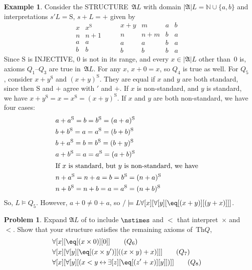 \documentclass[10pt,a4paper]{article}
\makeatletter
\newcommand*{\olup}[1]{\MakeUppercase{#1}}
\theoremstyle{plain}
\theoremstyle{definition}
\newtheorem{ex}[thm]{Example}
\newtheorem{prob}{Problem}[section]
\theoremstyle{remark}
\newcommand*{\ollabel}[1]{\label{#1}}
\newcommand{\olref}{\@ifnextchar[{\olref@i}{\olref@final}}
\def\olref@i[#1]{\@ifnextchar[{\olref@ii}{\olref@final}}
\def\olref@ii[#1]{\@ifnextchar[{\olref@iii}{\olref@final}}
\def\olref@iii[#1]{\olref@final}
\def\olref@final#1{\ref{#1}}
\providecommand{\lforall}{\mathord{\forall}}
\providecommand{\lexists}{\mathord{\exists}}
\providecommand{\Obj}{}
\providecommand{\Struct}{\ensuremath{\mathfrak{A}}}
\providecommand{\Domain}{\ensuremath{|\mathfrak{A}|}}
\providecommand{\Assign}{\ensuremath{s}}
\providecommand{\Sat}[2]{\ensuremath{#1 \models #2}}
\providecommand{\Th}{\ensuremath{\mathrm{Th}}}
\providecommand{\Nat}{\ensuremath{\mathbb{N}}}
\providecommand{\liff}{\mathbin{\leftrightarrow}}
\providecommand{\nssucc}{\mathrm{S}}
\providecommand{\nsplus}{\mathbin{+}}
\providecommand{\nsless}{<}
\makeatother
\begin{document}
\begin{ex}
\ollabel{ex:model-L-of-Q} Consider the \olup{structure}~$\Struct{L}$ with
domain $\Domain{L} = \Nat \cup \{a, b\}$ and interpretations
$\Assign{\prime}{L} = \nssucc$, $\Assign{+}{L} = \nsplus$ given by
\[
\begin{array}{c|c}
  x & x^\nssucc \\
  \hline
  n & n+1 \\
  a & a\\
  b & b
\end{array}
\qquad
\begin{array}{c|ccc}
  x \nsplus y & m & a & b\\
  \hline
  n & n+m & b & a\\
  a & a & b & a\\
  b & b & b & a
\end{array}
\]
Since $\nssucc$ is \olup{injective}, $0$ is not in its range, and every
$x \in \Domain{L}$ other than~$0$ is, axioms $Q_1$--$Q_3$ are true
in~$\Struct{L}$. For any $x$, $x \nsplus 0 = x$, so $Q_4$ is true as
well.  For $Q_5$, consider $x \nsplus y^\nssucc$ and $(x \nsplus
y)^\nssucc$. They are equal if $x$ and $y$ are both standard, since
then $\nssucc$ and $\nsplus$ agree with $\prime$ and $+$. If $x$ is
non-standard, and $y$ is standard, we have $x \nsplus y^\nssucc = x =
x^\nssucc = (x \nsplus y)^\nssucc$. If $x$ and $y$ are both
non-standard, we have four cases:
\begin{align*}
&  a \nsplus a^\nssucc  = b = b^\nssucc = (a \nsplus a)^\nssucc\\
&  b \nsplus b^\nssucc  = a = a^\nssucc = (b \nsplus b)^\nssucc\\
&  b \nsplus a^\nssucc  = b = b^\nssucc = (b \nsplus y)^\nssucc\\
&  a \nsplus b^\nssucc  = a = a^\nssucc = (a \nsplus b)^\nssucc\\
\intertext{If $x$ is standard, but $y$ is non-standard, we have}
&  n \nsplus a^\nssucc  = n \nsplus a = b = b^\nssucc = (n \nsplus a)^\nssucc\\
&  n \nsplus b^\nssucc  = n \nsplus b = a = a^\nssucc = (n \nsplus b)^\nssucc
\end{align*}
So, $\Sat{L}{Q_5}$. However, $a \nsplus 0 \neq 0 \nsplus a$, so
$\Sat/{L}{\lforall[x][\lforall[y][\eq[(x+y)][(y+x)]]]}$.
\end{ex}

\begin{prob}
Expand $\Struct{L}$ of \olref[mod][mar][mdq]{ex:model-L-of-Q} to
include $\nstimes$ and $\nsless$ that interpret~$\times$ and $<$. Show
that your structure satisfies the remaining axioms of~$\Th{Q}$,
\begin{align*}
& \lforall[x][\eq[(x \times \Obj 0)][\Obj 0]] \tag{$Q_6$}\\ &
  \lforall[x][\lforall[y][\eq[(x \times y')][((x \times y) + x)]]]
  \tag{$Q_7$}\\ & \lforall[x][\lforall[y][(x < y \liff \lexists[z][\eq[(z'+x)][y]])]] \tag{$Q_8$}
\end{align*}
\end{prob}
\end{document}
